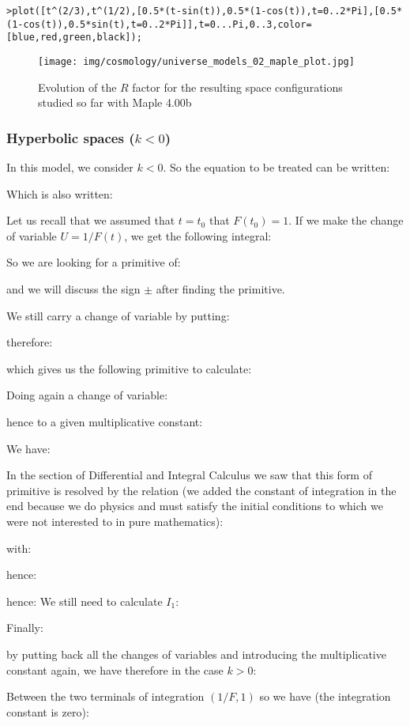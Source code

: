 	\texttt{>plot([t\string^(2/3),t\string^(1/2),[0.5*(t-sin(t)),0.5*(1-cos(t)),t=0..2*Pi],[0.5*\\(1-cos(t)),0.5*sin(t),t=0..2*Pi]],t=0...Pi,0..3,color=[blue,red,green,black]);}
	\begin{figure}[H]
		\centering
		\texttt{[image: img/cosmology/universe\_models\_02\_maple\_plot.jpg]}
		\caption[]{Evolution of the $R$ factor for the resulting space configurations studied so far with Maple 4.00b}
	\end{figure}
	
	\subsubsection{Hyperbolic spaces ($k<0$)}
	In this model, we consider $k<0$. So the equation to be treated can be written:
	
	Which is also written:
	
	Let us recall that we assumed that $t=t_0$ that $F(t_0)=1$. If we make the change of variable $U=1/F(t)$, we get the following integral:
	
	So we are looking for a primitive of:
	
	and we will discuss the sign $\pm$ after finding the primitive.

	We still carry a change of variable by putting:
	
	 therefore:
	
	which gives us the following primitive to calculate:
	
	Doing again a change of variable:
	
	hence to a given multiplicative constant:
	
	We have:
	
	In the section of Differential and Integral Calculus we saw that this form of primitive is resolved by the relation (we added the constant of integration in the end because we do physics and must satisfy the initial conditions to which we were not interested to in pure mathematics):
		
	with:
	
	hence:
	
	hence:
	We still need to calculate $I_1$:
	
	Finally:
	
	by putting back all the changes of variables and introducing the multiplicative constant again, we have therefore in the case $k>0$:
	
	Between the two terminals of integration $(1/F,1)$ so we have (the integration constant is zero):
	
